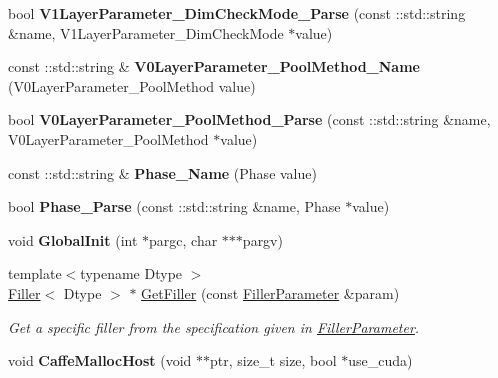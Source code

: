 \begin{DoxyCompactItemize}
bool {\bfseries V1\+Layer\+Parameter\+\_\+\+Dim\+Check\+Mode\+\_\+\+Parse} (const \+::std\+::string \&name, V1\+Layer\+Parameter\+\_\+\+Dim\+Check\+Mode $\ast$value)
\item 
\mbox{\label{namespacecaffe_af8e1b6f507af7f266e74c89c96242cb3}} 
const \+::std\+::string \& {\bfseries V0\+Layer\+Parameter\+\_\+\+Pool\+Method\+\_\+\+Name} (V0\+Layer\+Parameter\+\_\+\+Pool\+Method value)
\item 
\mbox{\label{namespacecaffe_af15e235c44b7e95d2208ba2c4e814780}} 
bool {\bfseries V0\+Layer\+Parameter\+\_\+\+Pool\+Method\+\_\+\+Parse} (const \+::std\+::string \&name, V0\+Layer\+Parameter\+\_\+\+Pool\+Method $\ast$value)
\item 
\mbox{\label{namespacecaffe_a3bf70d0aa4de53eceea6304600a80ba8}} 
const \+::std\+::string \& {\bfseries Phase\+\_\+\+Name} (Phase value)
\item 
\mbox{\label{namespacecaffe_a612e3291d3133eab83c9df71c49c0627}} 
bool {\bfseries Phase\+\_\+\+Parse} (const \+::std\+::string \&name, Phase $\ast$value)
\item 
\mbox{\label{namespacecaffe_aeb24443c97c8ad71325dab3e8b6fe8fa}} 
void {\bfseries Global\+Init} (int $\ast$pargc, char $\ast$$\ast$$\ast$pargv)
\item 
{\footnotesize template$<$typename Dtype $>$ }\\\mbox{\hyperlink{classcaffe_1_1_filler}{Filler}}$<$ Dtype $>$ $\ast$ \mbox{\hyperlink{namespacecaffe_a90854398629899a1cd21231df3beb9cb}{Get\+Filler}} (const \mbox{\hyperlink{classcaffe_1_1_filler_parameter}{Filler\+Parameter}} \&param)
\begin{DoxyCompactList}\small\item\em Get a specific filler from the specification given in \mbox{\hyperlink{classcaffe_1_1_filler_parameter}{Filler\+Parameter}}. \end{DoxyCompactList}\item 
\mbox{\label{namespacecaffe_a1d5bca26af8cf109866f31a6a9250673}} 
void {\bfseries Caffe\+Malloc\+Host} (void $\ast$$\ast$ptr, size\+\_\+t size, bool $\ast$use\+\_\+cuda)
\item 
\mbox{\label{namespacecaffe_a7f7cfe1afc7fa32c3f52d12184d8c00d}} 
$$
\end{DoxyCompactItemize}
